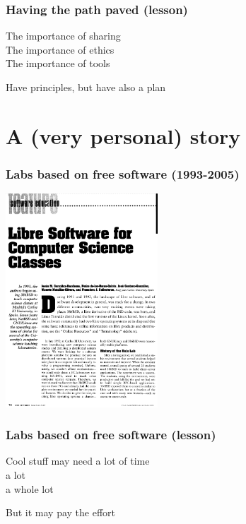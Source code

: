 \documentclass[17pt,aspectratio=169,hyperref=pdfusetitle]{beamer}
\begin{document}
\begin{frame}[fragile]
  \frametitle{Having the path paved (lesson)}

  The importance of sharing \\
  The importance of ethics \\
  The importance of tools \\

  \begin{center}
    Have principles, but have also a plan
  \end{center}
\end{frame}

\section{A (very personal) story}


\begin{frame}[fragile]
  \frametitle{Labs based on free software (1993-2005)}

  \begin{center}
  \includegraphics[height=8cm]{figs/libre-classes}
  \end{center}  
  
\end{frame}

\begin{frame}[fragile]
  \frametitle{Labs based on free software (lesson)}

  Cool stuff may need a lot of time \\
  a lot \\
  a whole lot \\

  \begin{center}
    But it may pay the effort
  \end{center}  
  
\end{frame}
\end{document}
